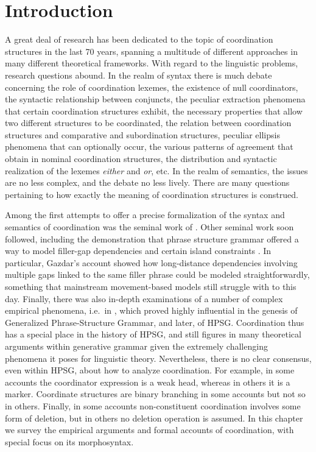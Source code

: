 {



\section{Introduction} 

A great deal of research has been dedicated to the topic of coordination structures in the last  70 years, spanning a multitude of different approaches in many different theoretical frameworks.  With regard to the linguistic problems, research questions abound. In the realm of syntax there is much debate concerning the role of coordination lexemes, the existence of null coordinators, the syntactic relationship between conjuncts, the peculiar extraction phenomena that certain coordination structures exhibit, the necessary properties that allow two different structures to be coordinated, the relation between coordination structures and comparative and subordination structures, peculiar ellipsis phenomena that can optionally occur, the various patterns of agreement that obtain in nominal coordination structures, the distribution and syntactic realization of the lexemes \emph{either} and \emph{or}, etc. In the realm of semantics, the issues are no less complex, and the debate no less lively. There are many questions pertaining to how exactly the meaning of coordination structures is construed. 

Among the first attempts to offer a precise formalization of the syntax and semantics of coordination was the seminal work of \citet{gazdarc}. Other seminal work soon followed, including the demonstration that phrase structure grammar offered a way to model filler-gap dependencies and certain island constraints \citep{gazdar}. In particular, Gazdar's account showed how long-distance dependencies involving multiple gaps linked to the same filler phrase could be modeled straightforwardly, something that mainstream movement-based models still struggle with to this day. Finally, there was also 
 in-depth examinations of a number of complex empirical phenomena, i.e.\ in  \citet{gazd1982}, which  proved highly influential in the genesis of Generalized Phrase-Structure Grammar, and later, of HPSG. Coordination thus has a special place in the history of HPSG, and still figures  in many theoretical arguments within generative grammar  given the extremely challenging phenomena it poses for linguistic theory. 
Nevertheless, there is no clear consensus, even within HPSG, about how to analyze coordination. For example, in some accounts the coordinator
expression is a weak head, whereas in others it is a marker. Coordinate structures are binary branching in some accounts but not so in others. Finally, in  some accounts non-constituent coordination involves some form of deletion, but in others no deletion operation is assumed.  
In this chapter we survey the empirical arguments and formal accounts of coordination, with special focus on its morphosyntax.

}
